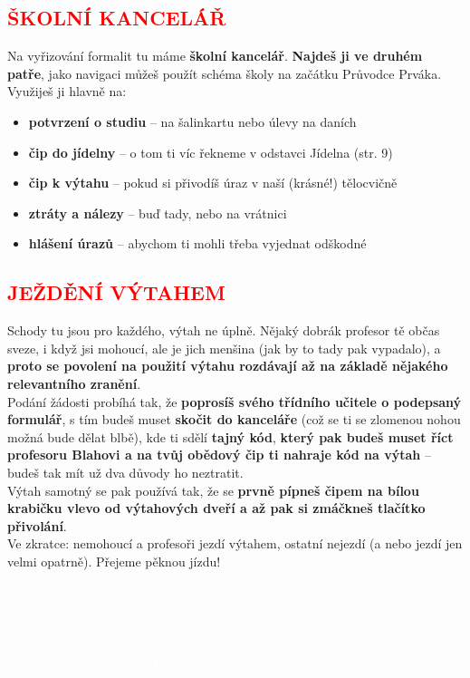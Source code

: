 \documentclass{article}
\newcommand{\podnadpis}[1]{
  \subsection*{\textcolor{red}{#1}}
}
\begin{document}
\newpage

\podnadpis{ŠKOLNÍ KANCELÁŘ}

Na vyřizování formalit tu máme \textbf{školní kancelář}. \textbf{Najdeš ji ve druhém patře}, jako
navigaci můžeš použít schéma školy na začátku Průvodce Prváka.
Využiješ ji hlavně na:
\begin{itemize}[leftmargin=10pt]
  \item \textbf{potvrzení o studiu} -- na šalinkartu nebo úlevy na daních
  \item \textbf{čip do jídelny} -- o tom ti víc řekneme v odstavci Jídelna (str. 9)
  \item \textbf{čip k výtahu} -- pokud si přivodíš úraz v naší (krásné!) tělocvičně
  \item \textbf{ztráty a nálezy} -- buď tady, nebo na vrátnici
  \item \textbf{hlášení úrazů} -- abychom ti mohli třeba vyjednat odškodné
\end{itemize}

\podnadpis{JEŽDĚNÍ VÝTAHEM}
Schody tu jsou pro každého, výtah ne úplně. Nějaký dobrák profesor tě občas sveze, i když jsi mohoucí, ale je jich menšina (jak by to tady pak vypadalo), a \textbf{proto se povolení na použití výtahu rozdávají až na základě nějakého relevantního zranění}. \\
Podání žádosti probíhá tak, že \textbf{poprosíš svého třídního učitele o podepsaný formulář}, s tím budeš muset \textbf{skočit do kanceláře} (což se ti se zlomenou nohou možná bude dělat blbě), kde ti sdělí \textbf{tajný kód}, \textbf{který pak budeš muset říct profesoru Blahovi a na tvůj
obědový čip ti nahraje kód na výtah} -- budeš tak mít už dva důvody ho neztratit. \\
Výtah samotný se pak používá tak, že se \textbf{prvně pípneš čipem na bílou krabičku
vlevo od výtahových dveří a až pak si zmáčkneš tlačítko přivolání}. \\
Ve zkratce: nemohoucí a profesoři jezdí výtahem, ostatní nejezdí (a nebo jezdí jen
velmi opatrně). Přejeme pěknou jízdu!

\begin{redbox}
  \textcolor{white}{\footnotesize Poznámka: Ne že bys nejen nesměl jezdit zdravý výtahem, ono to taky dost dobře nejde. Bez oprávnění na čipu tě výtah prostě nebude poslouchat a nepřijede ti. Když už je mysteriózně otevřen na patře prázdný, nikdo ti asi nebude fyzicky bránit do něj naskočit a odjet – ale pokud tě při tom načapá profesor, který to nemá rád, dostaneš bídu. Takže bacha.}
\end{redbox}
\end{document}
